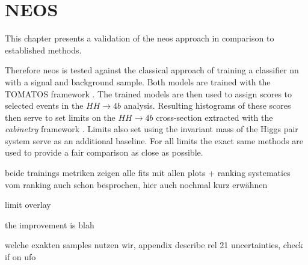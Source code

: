 \chapter{NEOS}
This chapter presents a validation of the \ac{neos} approach in comparison to established methods.


Therefore \ac{neos} is tested against the classical approach of training a classifier \ac{nn} with a signal and background sample. Both models are trained with the TOMATOS framework \citep{tomatos}. The trained models are then used to assign scores to selected events in the $HH\rightarrow4b$ analysis. Resulting histograms of these scores then serve to set limits on the $HH\rightarrow4b$ cross-section extracted with the \textit{cabinetry} framework \citep{cranmer_2021_4627038}. Limits also set using the invariant mass of the Higgs pair system serve as an additional baseline. For all limits the exact same methods are used to provide a fair comparison as close as possible.

beide trainings metriken zeigen
alle fits mit allen plots + ranking
systematics vom ranking auch schon besprochen, hier auch nochmal kurz erwähnen 

limit overlay 

the improvement is blah 




welche exakten samples nutzen wir, appendix
describe rel 21 uncertainties, check if on ufo